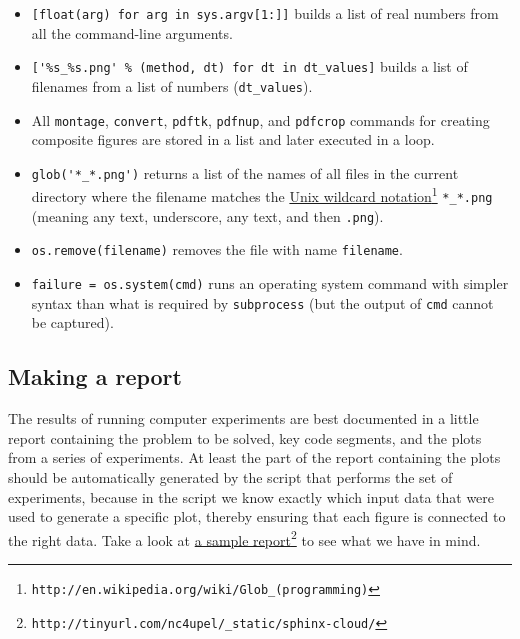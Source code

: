\documentclass[graybox,sectrefs,envcountresetchap,open=right,final]{svmonodo}
\begin{document}
\begin{itemize}
 \item \texttt{[float(arg) for arg in sys.argv[1:]]} builds a list of real numbers
   from all the command-line arguments.

 \item \Verb!['%
   filenames from a list of numbers (\Verb!dt_values!).

 \item All \texttt{montage}, \texttt{convert}, \texttt{pdftk}, \texttt{pdfnup}, and \texttt{pdfcrop}
   commands for creating
   composite figures are stored in a
   list and later executed in a loop.

 \item \Verb!glob('*_*.png')! returns a list of the names of all files in the
   current directory where the filename matches the \href{{http://en.wikipedia.org/wiki/Glob_(programming)}}{Unix wildcard notation}\footnote{\texttt{http://en.wikipedia.org/wiki/Glob\_(programming)}}
   \Verb!*_*.png! (meaning any text, underscore, any text, and then \texttt{.png}).

 \item \texttt{os.remove(filename)} removes the file with name \texttt{filename}.

 \item \texttt{failure = os.system(cmd)} runs an operating system command with
   simpler syntax than what is required by \texttt{subprocess} (but the output
   of \texttt{cmd} cannot be captured).
\end{itemize}

\noindent
\subsection{Making a report}
\label{softeng1:exper:report}

The results of running computer experiments are best documented in a
little report containing the problem to be solved, key code segments,
and the plots from a series of experiments. At least the part of the
report containing the plots should be automatically generated by the
script that performs the set of experiments, because in the script we
know exactly which input data that were used to generate a specific
plot, thereby ensuring that each figure is connected to the
right data. Take a look at \href{{http://tinyurl.com/nc4upel/_static/sphinx-cloud/}}{a sample report}\footnote{\texttt{http://tinyurl.com/nc4upel/\_static/sphinx-cloud/}}  to see what we have in
mind.
\end{document}
